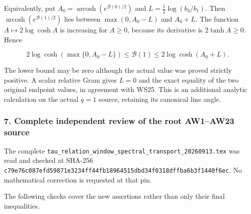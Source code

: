 \documentclass{article}
\begin{document}
Equivalently, put \(A_0=\operatorname{arcosh}(e^{\mathcal B(0)/2})\) and \(L=\tfrac12\log(b_3/b_1)\). Then \(\operatorname{arcosh}(e^{\mathcal B(1)/2})\) lies between \(\max(0,A_0-L)\) and \(A_0+L\). The function \(A\mapsto2\log\cosh A\) is increasing for \(A\ge0\), because its derivative is \(2\tanh A\ge0\). Hence

\[
2\log\cosh(\max\{0,A_0-L\})
\le\mathcal B(1)\le2\log\cosh(A_0+L).
\tag{WS39}
\]

The lower bound may be zero although the actual value was proved strictly positive. A scalar relative Gram gives \(L=0\) and the exact equality of the two original endpoint values, in agreement with WS25. This is an additional analytic calculation on the actual \(q=1\) source, retaining its canonical line angle.

\subsubsection{7. Complete independent review of the root AW1--AW23 source}\label{endpoint-window_review--complete-independent-review-of-the-root-aw1aw23-source}

The complete \nolinkurl{tau_relation_window_spectral_transport_20260913.tex} was read and checked at SHA-256 \nolinkurl{c79e76c087efd59871e3234ff44fb18964515dbd34f0318dffba6b3f1440f6ec}. No mathematical correction is requested at that pin.

The following checks cover the new assertions rather than only their final inequalities.
\end{document}
